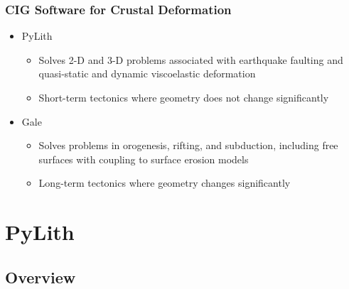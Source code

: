 \documentclass{beamer}
\begin{document}
\begin{frame}
  \frametitle{CIG Software for Crustal Deformation}
  \summary{}

  \begin{itemize}
  \item PyLith
    \begin{itemize}
    \item Solves 2-D and 3-D problems associated with earthquake
      faulting and quasi-static and dynamic viscoelastic deformation
    \item Short-term tectonics where geometry does not change
      significantly
    \end{itemize}
  \item Gale
    \begin{itemize}
    \item Solves problems in orogenesis, rifting, and subduction,
      including free surfaces with coupling to surface erosion models
    \item Long-term tectonics where geometry changes significantly
    \end{itemize}
  \end{itemize}
 
\end{frame}


\section{PyLith}
\subsection{Overview}
\end{document}
